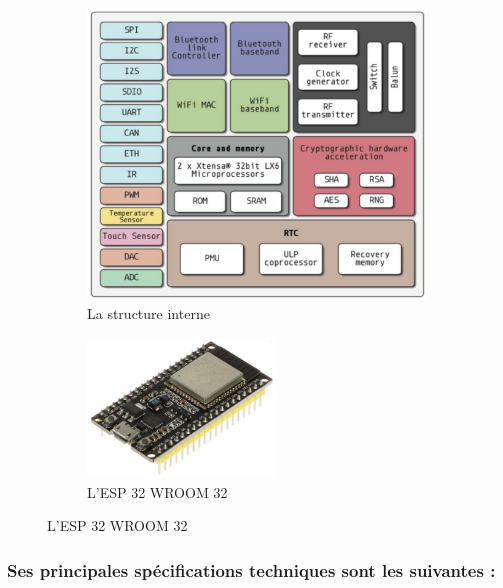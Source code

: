 \begin{figure}[H]
	\centering
	\begin{subfigure}{0.40\textwidth} %
		\centering
		\includegraphics[width=9cm]{./img/composants/espInterne.png}
		\caption{La structure interne \cite{8} }
		\label{i1}
	\end{subfigure}
	\hfill
	\begin{subfigure}{0.55\textwidth} %
			\centering
		\includegraphics[width=5cm]{./img/composants/ESP.jpg}
		\caption{L'ESP 32 WROOM 32  \cite{5} }
		\label{i1}
	\end{subfigure}
\end{figure}

\subsubsection*{Ses principales spécifications techniques sont les suivantes :}

